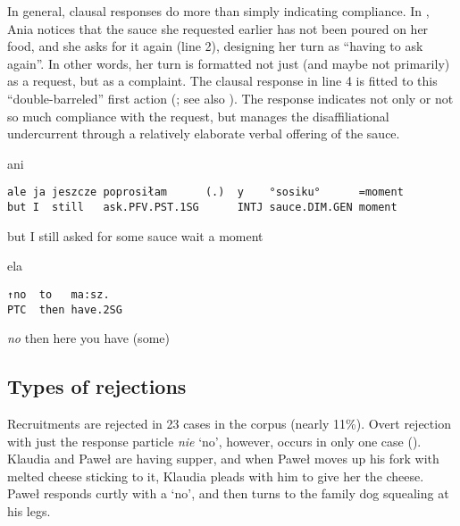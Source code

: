\documentclass[output=paper]{langsci/langscibook}
\begin{document}
In general, clausal responses do more than simply indicating compliance.  In , Ania notices that the sauce she requested earlier has not been poured on her food, and she asks for it again (line 2), designing her turn as “having to ask again”.  In other words, her turn is formatted not just (and maybe not primarily) as a request, but as a complaint.  The clausal response in line 4 is fitted to this ``double-barreled'' first action (\citealt[76]{Schegloff2007}; see also \citealt{KitzingerEtAl2013,Rossi2018}). The response indicates not only or not so much compliance with the request, but manages the disaffiliational undercurrent through a relatively elaborate verbal offering of the sauce.

\vspace{2mm}
%
%
\begin{mdframednoverticalspace}[style=firstfoc]
\begin{transbox}{2}{ani}
\begin{verbatim}
ale ja jeszcze poprosiłam      (.)  y    °sosiku°      =moment
but I  still   ask.PFV.PST.1SG      INTJ sauce.DIM.GEN moment
\end{verbatim}
but I still asked for some sauce \hspace{1.2cm} wait a moment
\end{transbox}
\end{mdframednoverticalspace}
%
%
\begin{mdframednoverticalspace}[style=secondfoc]
\begin{transbox}{4}{ela}
\begin{verbatim}
↑no  to   ma:sz.
PTC  then have.2SG
\end{verbatim}
\textit{no} then here you have (some)
\end{transbox}
\end{mdframednoverticalspace}
%
\begin{mdframednoverticalspace}[style=secondfoc]
\end{mdframednoverticalspace}\vspace{-2mm}

\subsection{Types of rejections}

Recruitments are rejected in 23 cases in the corpus (nearly 11\%).  Overt rejection with just the response particle \textit{nie} `no', however, occurs in only one case ().  Klaudia and Paweł are having supper, and when Paweł moves up his fork with melted cheese sticking to it, Klaudia pleads with him to give her the cheese.  Paweł responds curtly with a `no', and then turns to the family dog squealing at his legs.
\newpage
\end{document}
